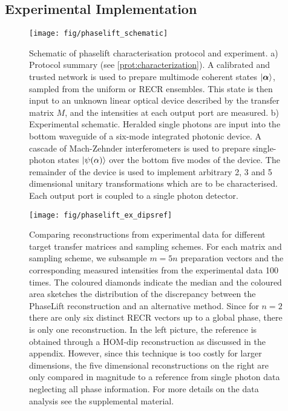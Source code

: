 \subsection{Experimental Implementation}

\begin{figure}[tbp]
  \centering
  \texttt{[image: fig/phaselift\_schematic]}%
  \caption{%
    Schematic of phaselift characterisation protocol and experiment.
     a) Protocol summary (see \cref{prot:characterization}).
     A calibrated and trusted network is used to prepare multimode coherent states ${|{\boldsymbol{\alpha}}\rangle}$, sampled from the uniform or RECR ensembles.
     This state is then input to an unknown linear optical device described by the transfer matrix $ M$, and the intensities at each output port are measured.
     b) Experimental schematic.
     Heralded single photons are input into the bottom waveguide of a six-mode integrated photonic device.
     A cascade of Mach-Zehnder interferometers is used to prepare single-photon states ${|{\psi( \alpha)}\rangle}$ over the bottom five modes of the device.
     The remainder of the device is used to implement arbitrary 2, 3 and 5 dimensional unitary transformations which are to be characterised.
     Each output port is coupled to a single photon detector.
   }
  \label{fig:experimental.schematic}
\end{figure}


\begin{figure*}[tbp]
  \centering
  \texttt{[image: fig/phaselift\_ex\_dipsref]}
  \caption{%
     \label{fig:experimental.overview}
     Comparing reconstructions from experimental data for different target transfer matrices and sampling schemes.
     For each matrix and sampling scheme, we subsample $m = 5n$ preparation vectors and the corresponding measured intensities from the experimental data 100 times.
     The coloured diamonds indicate the median and the coloured area sketches the distribution of the discrepancy between the PhaseLift reconstruction and an alternative method.
     Since for $n=2$ there are only six distinct RECR vectors up to a global phase, there is only one reconstruction.
     In the left picture, the reference is obtained through a HOM-dip reconstruction as discussed in the appendix.
     However, since this technique is too costly for larger dimensions, the five dimensional reconstructions on the right are only compared in magnitude to a reference from single photon data neglecting all phase information.
     For more details on the data analysis see the supplemental material.
  }
\end{figure*}

